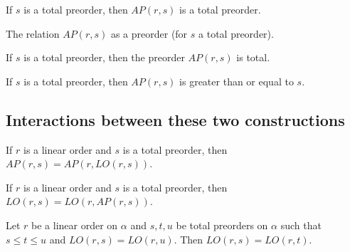 \begin{sublemma}
If $s$ is a total preorder, then $AP(r,s)$ is a total preorder.

\end{sublemma}

\begin{subdefi}[AscentPartition]
The relation $AP(r,s)$ as a preorder (for $s$ a total preorder).

\end{subdefi}

\begin{sublemma}
If $s$ is a total preorder, then the preorder $AP(r,s)$ is total.

\end{sublemma}

\begin{sublemma}
If $s$ is a total preorder, then $AP(r,s)$ is greater than or equal to $s$.

\end{sublemma}


\subsection{Interactions between these two constructions}

\begin{sublemma}
If $r$ is a linear order and $s$ is a total preorder, then $AP(r,s)=AP(r,LO(r,s))$.

\end{sublemma}

\begin{sublemma}
If $r$ is a linear order and $s$ is a total preorder, then $LO(r,s)=LO(r,AP(r,s))$.

\end{sublemma}

\begin{sublemma}
Let $r$ be a linear order on $\alpha$ and $s,t,u$ be total preorders on $\alpha$ such that $s\le t\le u$ and $LO(r,s)=LO(r,u)$. Then $LO(r,s)=LO(r,t)$.

\end{sublemma}

